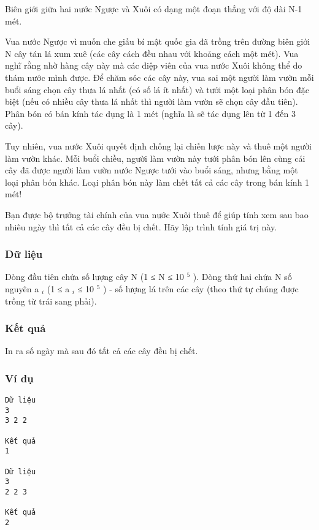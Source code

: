 



   Biên giới giữa hai nước Ngược và Xuôi có dạng một đoạn thẳng với độ dài N-1 mét.  

   Vua nước Ngược vì muốn che giấu bí mật quốc gia đã trồng trên đường biên giới N cây tán lá xum xuê (các cây cách đều nhau với khoảng cách một mét). Vua nghĩ rằng nhờ hàng cây này mà các điệp viên của vua nước Xuôi không thể do thám nước mình được. Để chăm sóc các cây này, vua sai một người làm vườn mỗi buổi sáng chọn cây thưa lá nhất (có số lá ít nhất) và tưới một loại phân bón đặc biệt (nếu có nhiều cây thưa lá nhất thì người làm vườn sẽ chọn cây đầu tiên). Phân bón có bán kính tác dụng là 1 mét (nghĩa là sẽ tác dụng lên từ 1 đến 3 cây).  

   Tuy nhiên, vua nước Xuôi quyết định chống lại chiến lược này và thuê một người làm vườn khác. Mỗi buổi chiều, người làm vườn này tưới phân bón lên cùng cái cây đã được người làm vườn nước Ngược tưới vào buổi sáng, nhưng bằng một loại phân bón khác. Loại phân bón này làm chết tất cả các cây trong bán kính 1 mét!  

   Bạn được bộ trưởng tài chính của vua nước Xuôi thuê để giúp tính xem sau bao nhiêu ngày thì tất cả các cây đều bị chết. Hãy lập trình tính giá trị này.  

\subsubsection{   Dữ liệu  }

   Dòng đầu tiên chứa số lượng cây N (1 ≤ N ≤ 10   $^    5   $   ). Dòng thứ hai chứa N số nguyên a   $_    i   $   (1 ≤ a   $_    i   $   ≤ 10   $^    5   $   ) - số lượng lá trên các cây (theo thứ tự chúng được trồng từ trái sang phải).  

\subsubsection{   Kết quả  }

   In ra số ngày mà sau đó tất cả các cây đều bị chết.  

\subsubsection{   Ví dụ  }
\begin{verbatim}
Dữ liệu
3
3 2 2

Kết quả
1

Dữ liệu
3
2 2 3

Kết quả
2
\end{verbatim}